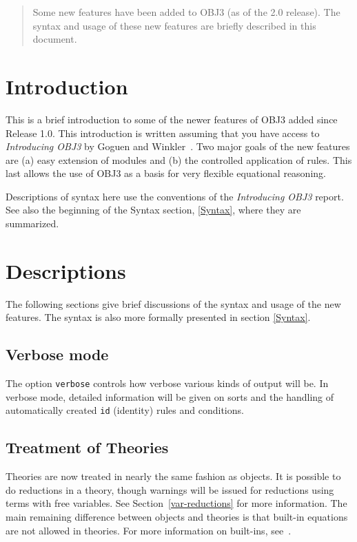 \begin{quotation} 
  Some new features have been added to OBJ3 (as of the 2.0 release).
  The syntax and usage of these new features are briefly described in
  this document.
\end{quotation}

\section{Introduction}
This is a brief introduction to some of the newer features of OBJ3
added since Release 1.0.  This introduction is written assuming that
you have access to {\em Introducing OBJ3} by Goguen and
Winkler~\cite{iobj3}.  Two major goals of the new features are (a)
easy extension of modules and (b) the controlled application of rules.
This last allows the use of OBJ3 as a basis for very flexible
equational reasoning.

Descriptions of syntax here use the conventions of the {\em
  Introducing OBJ3} report.  See also the beginning of the Syntax
section, \ref{Syntax}, where they are summarized.

\section{Descriptions}
The following sections give brief discussions of the syntax and usage
of the new features.  The syntax is also more formally presented in
section \ref{Syntax}.

\subsection{Verbose mode}
The option {\tt verbose} controls how verbose various kinds of output
will be.  In verbose mode, detailed information will be given on sorts
and the handling of automatically created {\tt id} (identity) rules
and conditions.

\subsection{Treatment of Theories}
Theories are now treated in nearly the same fashion as objects.  It is
possible to do reductions in a theory, though warnings will be issued
for reductions using terms with free variables.  See
Section~\ref{var-reductions} for more information.  The main remaining
difference between objects and theories is that built-in equations are
not allowed in theories.  For more information on built-ins,
see~\cite{bi}.

